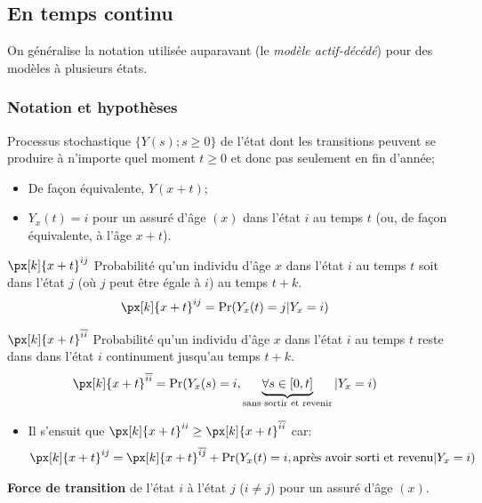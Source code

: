 \documentclass[10pt, french]{article}
\begin{document}
\begin{multicols*}{2}
\subsection{En temps continu}
On généralise la notation utilisée auparavant (le \textit{modèle actif-décédé}) pour des modèles à plusieurs états.

\subsubsection*{Notation et hypothèses}
\begin{description}
	\item[$Y_{x}(t)$]	Processus stochastique $\{Y(s); s \ge 0\}$ de l'état dont les transitions peuvent se produire à n'importe quel moment $t \ge 0$ et donc pas seulement en fin d'année;
		\begin{itemize}[leftmargin = *]
		\item	De façon équivalente, $Y(x + t)$;
		\item	$Y_{x}(t) = i$ pour un assuré d'âge $(x)$ dans l'état $i$ au temps $t$ (ou, de façon équivalente, à l'âge $x + t$).
		\end{itemize}
	\item	$\px[k]{x + t}^{ij}$	Probabilité qu'un individu d'âge $x$ dans l'état $i$ au temps $t$ soit dans l'état $j$ (où $j$ peut être égale à $i$) au temps $t + k$.
		\begin{align*}
		\px[k]{x + t}^{ij}
		&=	\Pr(Y_{x}(t) = j | Y_{x} = i)
		\end{align*}
	\item	$\px[k]{x + t}^{\overline{ii}}$	Probabilité qu'un individu d'âge $x$ dans l'état $i$ au temps $t$ reste dans dans l'état $i$ continument jusqu'au temps $t + k$.
		\begin{align*}
		\px[k]{x + t}^{\overline{ii}}
		&=	\Pr(Y_{x}(s) = i, \underbrace{\forall s \in [0, t]}_{\text{sans sortir et revenir}} | Y_{x} = i)
		\end{align*}
		\begin{itemize}[leftmargin = *]
			\item	Il s'ensuit que $\px[k]{x + t}^{ii} \geq \px[k]{x + t}^{\overline{ii}}$ car:
				\begin{align*}
				\px[k]{x + t}^{ij}
				&=	\px[k]{x + t}^{\overline{ij}} + \Pr(Y_{x}(t) = i, \text{après avoir sorti et revenu} | Y_{x} = i)	\\
				\end{align*}
		\end{itemize}
	\item[$\mu_{x}^{ij}$]	\textbf{Force de transition} de l'état $i$ à l'état $j$ (\underline{$i \neq j$}) pour un assuré d'âge $(x)$.

\end{description}
\end{multicols*}
\end{document}
